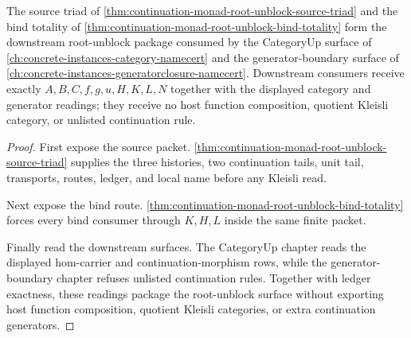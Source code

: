 \begin{theorem}
\label{thm:continuation-monad-root-unblock-downstream-package}
The source triad of \autoref{thm:continuation-monad-root-unblock-source-triad} and the bind totality of \autoref{thm:continuation-monad-root-unblock-bind-totality} form the downstream root-unblock package consumed by the CategoryUp surface of \autoref{ch:concrete-instances-category-namecert} and the generator-boundary surface of \autoref{ch:concrete-instances-generatorclosure-namecert}. Downstream consumers receive exactly $A,B,C,f,g,u,H,K,L,N$ together with the displayed category and generator readings; they receive no host function composition, quotient Kleisli category, or unlisted continuation rule.
\end{theorem}
\begin{proof}
First expose the source packet. \autoref{thm:continuation-monad-root-unblock-source-triad} supplies the three histories, two continuation tails, unit tail, transports, routes, ledger, and local name before any Kleisli read.

Next expose the bind route. \autoref{thm:continuation-monad-root-unblock-bind-totality} forces every bind consumer through $K,H,L$ inside the same finite packet.

Finally read the downstream surfaces. The CategoryUp chapter reads the displayed hom-carrier and continuation-morphism rows, while the generator-boundary chapter refuses unlisted continuation rules. Together with ledger exactness, these readings package the root-unblock surface without exporting host function composition, quotient Kleisli categories, or extra continuation generators.
\end{proof}

